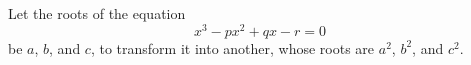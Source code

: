 Let the roots of the equation 
\[
x^3 - px^2 + qx - r = 0
\]
be $a$, $b$, and $c$, to transform it
into another, whose roots are $a^2$,
$b^2$, and $c^2$.
